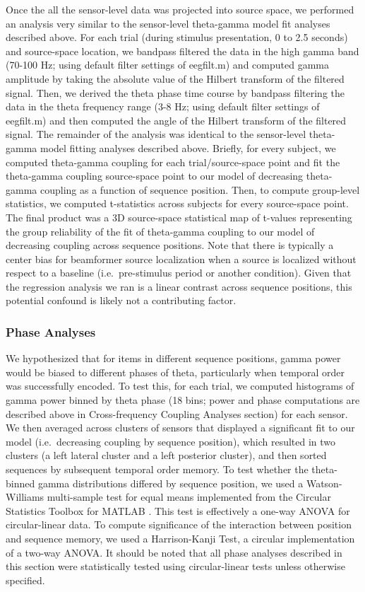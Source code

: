 Once the all the sensor-level data was projected into source space, we
performed an analysis very similar to the sensor-level theta-gamma model
fit analyses described above. For each trial (during stimulus
presentation, 0 to 2.5 seconds) and source-space location, we bandpass
filtered the data in the high gamma band (70-100 Hz; using default
filter settings of eegfilt.m) and computed gamma amplitude by taking the
absolute value of the Hilbert transform of the filtered signal. Then, we
derived the theta phase time course by bandpass filtering the data in
the theta frequency range (3-8 Hz; using default filter settings of
eegfilt.m) and then computed the angle of the Hilbert transform of the
filtered signal. The remainder of the analysis was identical to the
sensor-level theta-gamma model fitting analyses described above.
Briefly, for every subject, we computed theta-gamma coupling for each
trial/source-space point and fit the theta-gamma coupling source-space
point to our model of decreasing theta-gamma coupling as a function of
sequence position. Then, to compute group-level statistics, we computed
t-statistics across subjects for every source-space point. The final
product was a 3D source-space statistical map of t-values representing
the group reliability of the fit of theta-gamma coupling to our model of
decreasing coupling across sequence positions. Note that there is
typically a center bias for beamformer source localization when a source
is localized without respect to a baseline (i.e.~pre-stimulus period or
another condition). Given that the regression analysis we ran is a
linear contrast across sequence positions, this potential confound is
likely not a contributing factor.

\subsubsection{Phase Analyses}\label{phase-analyses}

We hypothesized that for items in different sequence positions, gamma
power would be biased to different phases of theta, particularly when
temporal order was successfully encoded. To test this, for each trial,
we computed histograms of gamma power binned by theta phase (18 bins;
power and phase computations are described above in Cross-frequency
Coupling Analyses section) for each sensor. We then averaged across
clusters of sensors that displayed a significant fit to our model
(i.e.~decreasing coupling by sequence position), which resulted in two
clusters (a left lateral cluster and a left posterior cluster), and then
sorted sequences by subsequent temporal order memory. To test whether
the theta-binned gamma distributions differed by sequence position, we
used a Watson-Williams multi-sample test for equal means implemented
from the Circular Statistics Toolbox for MATLAB
\autocite{berens_circstat:_2009}. This test is effectively a one-way
ANOVA for circular-linear data. To compute significance of the
interaction between position and sequence memory, we used a
Harrison-Kanji Test, a circular implementation of a two-way ANOVA. It
should be noted that all phase analyses described in this section were
statistically tested using circular-linear tests unless otherwise
specified.

